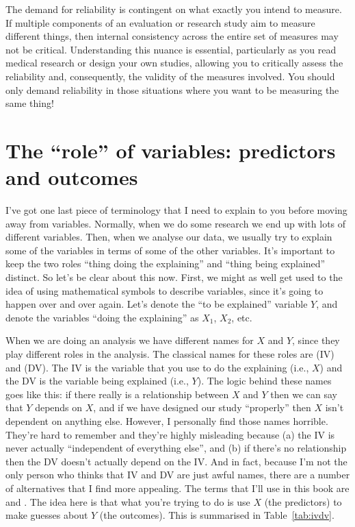 The demand for reliability is contingent on what exactly you intend to measure. If multiple components of an evaluation or research study aim to measure different things, then internal consistency across the entire set of measures may not be critical. Understanding this nuance is essential, particularly as you read medical research or design your own studies, allowing you to critically assess the reliability and, consequently, the validity of the measures involved. You should only demand reliability in those situations where you want to be measuring the same thing!


\section{The \texorpdfstring{``role''}{role} of variables: predictors and outcomes \label{sec:ivdv}}

I've got one last piece of terminology that I need to explain to you before moving away from variables. Normally, when we do some research we end up with lots of different variables. Then, when we analyse our data, we usually try to explain some of the variables in terms of some of the other variables. It's important to keep the two roles ``thing doing the explaining'' and ``thing being explained'' distinct. So let's be clear about this now. First, we might as well get used to the idea of using mathematical symbols to describe variables, since it's going to happen over and over again. Let's denote the ``to be explained'' variable $Y$, and denote the variables ``doing the explaining'' as $X_1$, $X_2$, etc. 

When we are doing an analysis we have different names for $X$ and $Y$, since they play different roles in the analysis. The classical names for these roles are  (IV) and  (DV). The IV is the variable that you use to do the explaining (i.e., $X$) and the DV is the variable being explained (i.e., $Y$). The logic behind these names goes like this: if there really is a relationship between $X$ and $Y$ then we can say that $Y$ depends on $X$, and if we have designed our study ``properly'' then $X$ isn't dependent on anything else. However, I personally find those names horrible. They're hard to remember and they're highly misleading because (a) the IV is never actually ``independent of everything else'', and (b) if there's no relationship then the DV doesn't actually depend on the IV. And in fact, because I'm not the only person who thinks that IV and DV are just awful names, there are a number of alternatives that I find more appealing. The terms that I'll use in this book are  and . The idea here is that what you're trying to do is use $X$ (the predictors) to make guesses about $Y$ (the outcomes). This is summarised in Table~\ref{tab:ivdv}.


